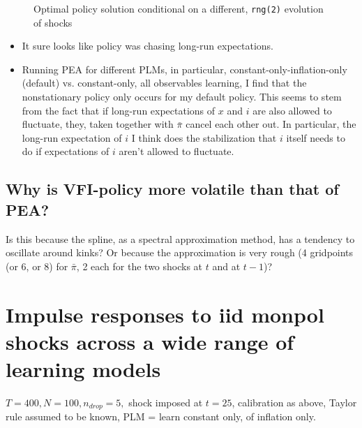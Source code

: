\documentclass[11pt]{article}
\def \myFigPath {../../figures/}
\renewcommand{\[}{\begin{equation}}
\renewcommand{\]}{\end{equation}}
\def\myTinyFigScale{0.16}
\begin{document}
\begin{figure}[h!]
\hfill
{}
\hfill
{}
\caption{Optimal policy solution conditional on a different, \texttt{rng(2)} evolution of shocks}
\end{figure}
\begin{itemize}
\item It sure looks like policy was chasing long-run expectations.
\item Running PEA for different PLMs, in particular, constant-only-inflation-only (default) vs. constant-only, all observables learning, I find that the nonstationary policy only occurs for my default policy. This seems to stem from the fact that if long-run expectations of $x$ and $i$ are also allowed to fluctuate, they, taken together with $\bar{\pi}$ cancel each other out. In particular, the long-run expectation of $i$ I think does the stabilization that $i$ itself needs to do if expectations of $i$ aren't allowed to fluctuate.
\end{itemize}

\subsection{Why is VFI-policy more volatile than that of PEA?}
Is this because the spline, as a spectral approximation method, has a tendency to oscillate around kinks? Or because the approximation is very rough (4 gridpoints (or 6, or 8) for $\bar{\pi}$, 2 each for the two shocks at $t$ and at $t-1$)?

\clearpage
\section{Impulse responses to iid monpol shocks across a wide range of learning models}
$T=400, N=100, n_{drop}=5,$ shock imposed at $t=25$, calibration as above, Taylor rule assumed to be known, PLM = learn constant only, of inflation only.
\end{document}
